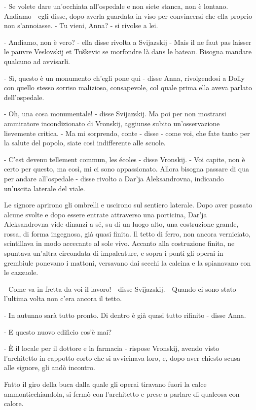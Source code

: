 - Se volete dare un'occhiata all'ospedale e non siete stanca, non è lontano. Andiamo - egli disse, dopo averla guardata in viso per convincersi che ella proprio non s'annoiasse. - Tu vieni, Anna? - si rivolse a lei. 

- Andiamo, non è vero? - ella disse rivolta a Svijazskij - Mais il ne faut pas laisser le pauvre Veslovskij et Tuškevic se morfondre là dans le bateau. Bisogna mandare qualcuno ad avvisarli. 

- Sì, questo è un monumento ch'egli pone qui - disse Anna, rivolgendosi a Dolly con quello stesso sorriso malizioso, consapevole, col quale prima ella aveva parlato dell'ospedale. 

- Oh, una cosa monumentale! - disse Svijazskij. Ma poi per non mostrarsi ammiratore incondizionato di Vronskij, aggiunse subito un'osservazione lievemente critica. - Ma mi sorprendo, conte - disse - come voi, che fate tanto per la salute del popolo, siate così indifferente alle scuole. 

- C'est devenu tellement commun, les écoles - disse Vronskij. - Voi capite, non è certo per questo, ma così, mi ci sono appassionato. Allora bisogna passare di qua per andare all'ospedale - disse rivolto a Dar'ja Aleksandrovna, indicando un'uscita laterale del viale. 

Le signore aprirono gli ombrelli e uscirono sul sentiero laterale. Dopo aver passato alcune svolte e dopo essere entrate attraverso una porticina, Dar'ja Aleksandrovna vide dinanzi a sé, su di un luogo alto, una costruzione grande, rossa, di forma ingegnosa, già quasi finita. Il tetto di ferro, non ancora verniciato, scintillava in modo accecante al sole vivo. Accanto alla costruzione finita, ne spuntava un'altra circondata di impalcature, e sopra i ponti gli operai in grembiule ponevano i mattoni, versavano dai secchi la calcina e la spianavano con le cazzuole. 

- Come va in fretta da voi il lavoro! - disse Svijazskij. - Quando ci sono stato l'ultima volta non c'era ancora il tetto. 

- In autunno sarà tutto pronto. Di dentro è già quasi tutto rifinito - disse Anna. 

- E questo nuovo edificio cos'è mai? 

- È il locale per il dottore e la farmacia - rispose Vronskij, avendo visto l'architetto in cappotto corto che si avvicinava loro, e, dopo aver chiesto scusa alle signore, gli andò incontro. 

Fatto il giro della buca dalla quale gli operai tiravano fuori la calce ammonticchiandola, si fermò con l'architetto e prese a parlare di qualcosa con calore. 

